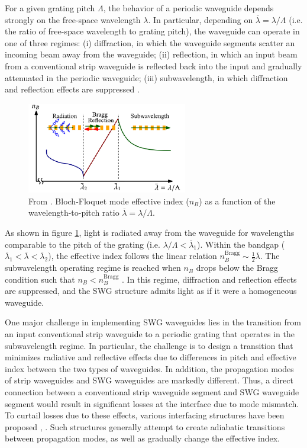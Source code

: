 \documentclass[aps,prl,twocolumn, superscriptaddress]{revtex4}
\begin{document}
For a given grating pitch $\Lambda$, the behavior of a periodic waveguide depends strongly on the free-space wavelength $\lambda$. In particular, depending on $\overline{\lambda} = \lambda/\Lambda$ (i.e. the ratio of free-space wavelength to grating pitch), the waveguide can operate in one of three regimes: (i) diffraction, in which the waveguide segments scatter an incoming beam away from the waveguide; (ii) reflection, in which an input beam from a conventional strip waveguide is reflected back into the input and gradually attenuated in the periodic waveguide; (iii) subwavelength, in which diffraction and reflection effects are suppressed \cite{HalirReview}. 

 \begin{figure}[!h]
    \centering
    \includegraphics[width=7cm]{swgoperation.png}
    \caption{From \cite{HalirReview}. Bloch-Floquet mode effective index ($n_B$) as a function of the wavelength-to-pitch ratio $\overline{\lambda} = \lambda/\Lambda$.}
    \label{fig:SWGoperation}
\end{figure}

As shown in figure \ref{fig:SWGoperation}, light is radiated away from the waveguide for wavelengths comparable to the pitch of the grating (i.e. $\lambda/\Lambda <\overline{\lambda}_1$). Within the bandgap ($\overline{\lambda}_1<\overline{\lambda}<\overline{\lambda}_2$), the effective index follows the linear relation $n_B^{\text{Bragg}} \sim \frac{1}{2}\overline{\lambda}$. The subwavelength operating regime is reached when $n_B$ drops below the Bragg condition such that $n_B<n_B^{\text{Bragg}}$ \cite{HalirReview}. In this regime, diffraction and reflection effects are suppressed, and the SWG structure admits light as if it were a homogeneous waveguide.

One major challenge in implementing SWG waveguides lies in the transition from an input conventional strip waveguide to a periodic grating that operates in the subwavelength regime. In particular, the challenge is to design a transition that minimizes radiative and reflective effects due to differences in pitch and effective index between the two types of waveguides. In addition, the propagation modes of strip waveguides and SWG waveguides are markedly different. Thus, a direct connection between a conventional strip waveguide segment and SWG waveguide segment would result in significant losses at the interface due to mode mismatch. To curtail losses due to these effects, various interfacing structures have been proposed \cite{BockPaper}, \cite{DonzellaPaper}. Such structures generally attempt to create adiabatic transitions between propagation modes, as well as gradually change the effective index.
\end{document}
